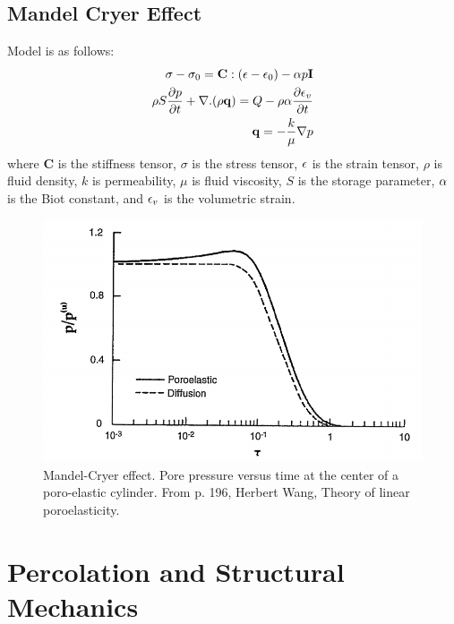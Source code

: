 \subsection{Mandel Cryer Effect}


Model is as follows:
%
\begin{align}
  \sigma - \sigma_0 = \mathbf{C}: \left( \epsilon - \epsilon_0\right) - \alpha p \mathbf{I}\\
  \rho S \frac{\partial p}{\partial t} + \nabla . (\rho \mathbf{q}) = Q - \rho \alpha \frac{\partial \epsilon_{v}}{\partial t}\\
  \mathbf{q} = - \frac{k}{\mu} \nabla p 
\end{align}
%
where $\mathbf{C}$ is the stiffness tensor, $\sigma$ is the stress
tensor, $\epsilon$ is the strain tensor, $\rho$ is fluid density, $k$ is permeability, $\mu$ is fluid
viscosity, $S$ is the storage parameter, $\alpha$ is the Biot constant,
and $\epsilon_v$ is the volumetric strain.


\begin{figure}[h]
  \centering
  \includegraphics[width=15cm]{Figs/mandel-cryer-effect}
  \caption{Mandel-Cryer effect. Pore pressure versus time at the
    center of a poro-elastic cylinder. From p. 196, Herbert Wang, Theory of
    linear poroelasticity.} \label{fig-soft-hard}
\end{figure}





\newpage

\newpage


\section{Percolation and Structural Mechanics}

